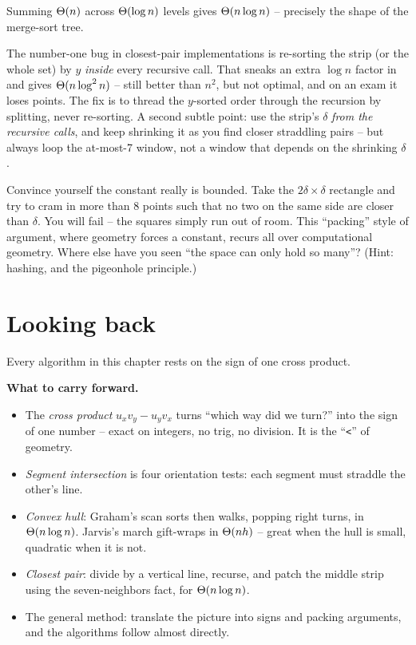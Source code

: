 Summing $\Theta(n)$ across $\Theta(\log n)$ levels gives $\Theta(n \log n)$ -- precisely the
shape of the merge-sort tree.

\begin{trapbox}
The number-one bug in closest-pair implementations is re-sorting the strip (or the
whole set) by $y$ \emph{inside} every recursive call. That sneaks an extra
$\log n$ factor in and gives $\Theta(n \log^2 n)$ -- still better than $n^2$, but not
optimal, and on an exam it loses points. The fix is to thread the $y$-sorted order
through the recursion by splitting, never re-sorting. A second subtle point: use
the strip's $\delta$ \emph{from the recursive calls}, and keep shrinking it as you
find closer straddling pairs -- but always loop the at-most-7 window, not a window
that depends on the shrinking $\delta$.
\end{trapbox}

\begin{walkbox}
Convince yourself the constant really is bounded. Take the $2\delta \times \delta$
rectangle and try to cram in more than 8 points such that no two on the same side
are closer than $\delta$. You will fail -- the squares simply run out of room.
This ``packing'' style of argument, where geometry forces a constant, recurs all
over computational geometry. Where else have you seen ``the space can only hold so
many''? (Hint: hashing, and the pigeonhole principle.)
\end{walkbox}

\section{Looking back}

Every algorithm in this chapter rests on the sign of one cross product.

\begin{focusbox}
\textbf{What to carry forward.}
\begin{itemize}
  \item The \emph{cross product} $u_x v_y - u_y v_x$ turns ``which way did we
        turn?'' into the sign of one number -- exact on integers, no trig, no
        division. It is the ``\texttt{<}'' of geometry.
  \item \emph{Segment intersection} is four orientation tests: each segment must
        straddle the other's line.
  \item \emph{Convex hull}: Graham's scan sorts then walks, popping right turns,
        in $\Theta(n \log n)$. Jarvis's march gift-wraps in $\Theta(nh)$ -- great when
        the hull is small, quadratic when it is not.
  \item \emph{Closest pair}: divide by a vertical line, recurse, and patch the
        middle strip using the seven-neighbors fact, for $\Theta(n \log n)$.
  \item The general method: translate the picture into signs and packing
        arguments, and the algorithms follow almost directly.
\end{itemize}
\end{focusbox}

